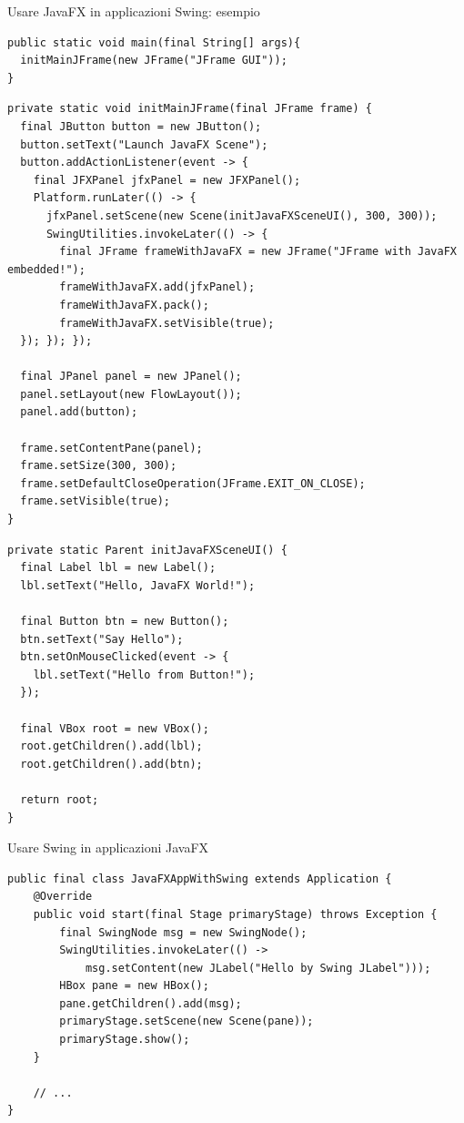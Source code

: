 \documentclass[xcolor=dvipsnames,presentation]{beamer}
\begin{document}
\begin{frame}{Usare JavaFX in applicazioni Swing: esempio}

\begin{lstlisting}[basicstyle=\tiny\ttfamily]
public static void main(final String[] args){
  initMainJFrame(new JFrame("JFrame GUI"));
}
\end{lstlisting}

\begin{lstlisting}[basicstyle=\tiny\ttfamily]
private static void initMainJFrame(final JFrame frame) {
  final JButton button = new JButton();
  button.setText("Launch JavaFX Scene");
  button.addActionListener(event -> {
    final JFXPanel jfxPanel = new JFXPanel();
    Platform.runLater(() -> {
      jfxPanel.setScene(new Scene(initJavaFXSceneUI(), 300, 300));
      SwingUtilities.invokeLater(() -> {
        final JFrame frameWithJavaFX = new JFrame("JFrame with JavaFX embedded!");
        frameWithJavaFX.add(jfxPanel);
        frameWithJavaFX.pack();
        frameWithJavaFX.setVisible(true);
  }); }); });

  final JPanel panel = new JPanel();
  panel.setLayout(new FlowLayout());
  panel.add(button);

  frame.setContentPane(panel);
  frame.setSize(300, 300);
  frame.setDefaultCloseOperation(JFrame.EXIT_ON_CLOSE);
  frame.setVisible(true);
}
\end{lstlisting}

\begin{lstlisting}[basicstyle=\tiny\ttfamily]
private static Parent initJavaFXSceneUI() {
  final Label lbl = new Label();
  lbl.setText("Hello, JavaFX World!");

  final Button btn = new Button();
  btn.setText("Say Hello");
  btn.setOnMouseClicked(event -> {
    lbl.setText("Hello from Button!");
  });

  final VBox root = new VBox();
  root.getChildren().add(lbl);
  root.getChildren().add(btn);

  return root;
}
\end{lstlisting}

\end{frame}

\begin{frame}[fragile]{Usare Swing in applicazioni JavaFX}

\begin{lstlisting}[basicstyle=\scriptsize\ttfamily]
public final class JavaFXAppWithSwing extends Application {
    @Override
    public void start(final Stage primaryStage) throws Exception {
        final SwingNode msg = new SwingNode();
        SwingUtilities.invokeLater(() ->
            msg.setContent(new JLabel("Hello by Swing JLabel")));
        HBox pane = new HBox();
        pane.getChildren().add(msg);
        primaryStage.setScene(new Scene(pane));
        primaryStage.show();
    }
    
    // ...
}
\end{lstlisting}

\end{frame}
\end{document}
